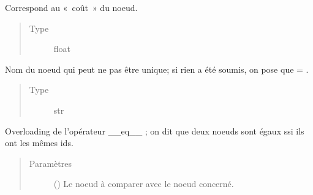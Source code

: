 \documentclass[letterpaper,10pt,french]{sphinxmanual}
\begin{document}
\begin{fulllineitems}
\begin{fulllineitems}
\end{fulllineitems}


\begin{fulllineitems}
\label{\detokenize{index:StrategyTree.NodeST._cost}}
Correspond au « coût » du noeud.
\begin{quote}\begin{description}
\item[{Type}] \leavevmode
float

\end{description}\end{quote}

\end{fulllineitems}


\begin{fulllineitems}
\label{\detokenize{index:StrategyTree.NodeST._name}}
Nom du noeud qui peut ne pas être unique; si rien a été soumis, on pose
que  = .
\begin{quote}\begin{description}
\item[{Type}] \leavevmode
str

\end{description}\end{quote}

\end{fulllineitems}


\begin{fulllineitems}
\label{\detokenize{index:StrategyTree.NodeST.__eq__}}
Overloading de l’opérateur \_\_eq\_\_ ; on dit que deux noeuds sont égaux
ssi ils ont les mêmes ids.
\begin{quote}\begin{description}
\item[{Paramètres}] \leavevmode
{} ({\hyperref[\detokenize{index:StrategyTree.NodeST}]{}}) \textendash{} Le noeud à comparer avec le noeud concerné.


\end{description}
\end{quote}
\end{fulllineitems}
\end{fulllineitems}
\end{document}
